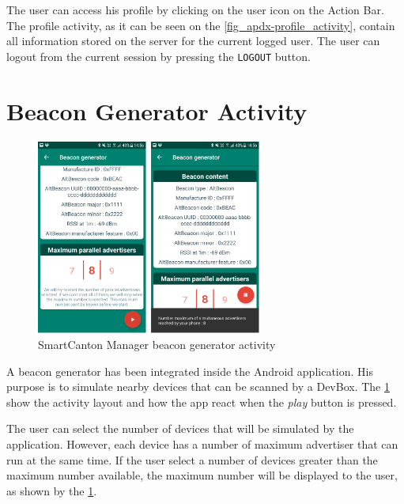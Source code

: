 The user can access his profile by clicking on the user icon on the Action Bar. The profile activity, as it can be seen on the \cref{fig_apdx-profile_activity}, contain all information stored on the server for the current logged user. The user can logout from the current session by pressing the \texttt{LOGOUT} button.\\

\FloatBarrier
\section{Beacon Generator Activity}
\begin{figure}[ht!]
    \centering
    \includegraphics[width=0.66\textwidth]{Figures/Appendixes/Android/beacon_gen_activity_start_adv.png}
    \caption{SmartCanton Manager beacon generator activity}
    \label{fig_apdx-beacon_gen_activity_start_adv}
\end{figure}
\FloatBarrier

A beacon generator has been integrated inside the Android application. His purpose is to simulate nearby devices that can be scanned by a DevBox. The \cref{fig_apdx-beacon_gen_activity_start_adv} show the activity layout and how the app react when the \textit{play} button is pressed.

The user can select the number of devices that will be simulated by the application. However, each device has a number of maximum advertiser that can run at the same time. If the user select a number of devices greater than the maximum number available, the maximum number will be displayed to the user, as shown by the \cref{fig_apdx-beacon_gen_activity_start_adv}.